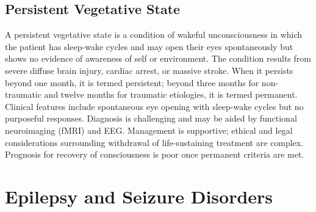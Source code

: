 \subsection{Persistent Vegetative State}
\label{sec:Persistent Vegetative State}
A persistent vegetative state is a condition of wakeful unconsciousness in which the patient has sleep-wake cycles and may open their eyes spontaneously but shows no evidence of awareness of self or environment. The condition results from severe diffuse brain injury, cardiac arrest, or massive stroke. When it persists beyond one month, it is termed persistent; beyond three months for non-traumatic and twelve months for traumatic etiologies, it is termed permanent. Clinical features include spontaneous eye opening with sleep-wake cycles but no purposeful responses. Diagnosis is challenging and may be aided by functional neuroimaging (fMRI) and EEG. Management is supportive; ethical and legal considerations surrounding withdrawal of life-sustaining treatment are complex. Prognosis for recovery of consciousness is poor once permanent criteria are met.

\section{Epilepsy and Seizure Disorders}








\label{sec:Epilepsy and Seizure Disorders}

